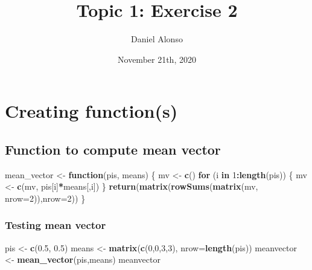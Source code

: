 \documentclass[]{article}
\title{Topic 1: Exercise 2}
\author{Daniel Alonso}
\date{November 21th, 2020}
\newenvironment{Shaded}{\begin{snugshade}}{\end{snugshade}}
\newcommand{\ControlFlowTok}[1]{\textcolor[rgb]{0.13,0.29,0.53}{\textbf{#1}}}
\newcommand{\DataTypeTok}[1]{\textcolor[rgb]{0.13,0.29,0.53}{#1}}
\newcommand{\DecValTok}[1]{\textcolor[rgb]{0.00,0.00,0.81}{#1}}
\newcommand{\FloatTok}[1]{\textcolor[rgb]{0.00,0.00,0.81}{#1}}
\newcommand{\KeywordTok}[1]{\textcolor[rgb]{0.13,0.29,0.53}{\textbf{#1}}}
\newcommand{\NormalTok}[1]{#1}
\newcommand{\OperatorTok}[1]{\textcolor[rgb]{0.81,0.36,0.00}{\textbf{#1}}}
\newcommand{\StringTok}[1]{\textcolor[rgb]{0.31,0.60,0.02}{#1}}
\begin{document}
\maketitle

\hypertarget{creating-functions}{%
\section{Creating function(s)}\label{creating-functions}}

\hypertarget{function-to-compute-mean-vector}{%
\subsection{Function to compute mean
vector}\label{function-to-compute-mean-vector}}

\begin{Shaded}
\begin{Highlighting}[]
\NormalTok{mean_vector <-}\StringTok{ }\ControlFlowTok{function}\NormalTok{(pis, means) \{}
\NormalTok{    mv <-}\StringTok{ }\KeywordTok{c}\NormalTok{()}
    \ControlFlowTok{for}\NormalTok{ (i }\ControlFlowTok{in} \DecValTok{1}\OperatorTok{:}\KeywordTok{length}\NormalTok{(pis)) \{}
\NormalTok{        mv <-}\StringTok{ }\KeywordTok{c}\NormalTok{(mv, pis[i]}\OperatorTok{*}\NormalTok{means[,i])}
\NormalTok{    \}}
    \KeywordTok{return}\NormalTok{(}\KeywordTok{matrix}\NormalTok{(}\KeywordTok{rowSums}\NormalTok{(}\KeywordTok{matrix}\NormalTok{(mv, }\DataTypeTok{nrow=}\DecValTok{2}\NormalTok{)),}\DataTypeTok{nrow=}\DecValTok{2}\NormalTok{))}
\NormalTok{\}}
\end{Highlighting}
\end{Shaded}

\hypertarget{testing-mean-vector}{%
\subsubsection{Testing mean vector}\label{testing-mean-vector}}

\begin{Shaded}
\begin{Highlighting}[]
\NormalTok{pis <-}\StringTok{ }\KeywordTok{c}\NormalTok{(}\FloatTok{0.5}\NormalTok{, }\FloatTok{0.5}\NormalTok{)}
\NormalTok{means <-}\StringTok{ }\KeywordTok{matrix}\NormalTok{(}\KeywordTok{c}\NormalTok{(}\DecValTok{0}\NormalTok{,}\DecValTok{0}\NormalTok{,}\DecValTok{3}\NormalTok{,}\DecValTok{3}\NormalTok{), }\DataTypeTok{nrow=}\KeywordTok{length}\NormalTok{(pis))}
\NormalTok{meanvector <-}\StringTok{ }\KeywordTok{mean_vector}\NormalTok{(pis,means)}
\NormalTok{meanvector}
\end{Highlighting}
\end{Shaded}
\end{document}
